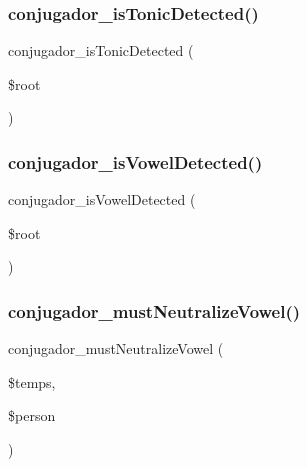 \subsubsection{\texorpdfstring{conjugador\+\_\+is\+Tonic\+Detected()}{conjugador\_isTonicDetected()}}
{\footnotesize\ttfamily conjugador\+\_\+is\+Tonic\+Detected (\begin{DoxyParamCaption}\item[{}]{\$root }\end{DoxyParamCaption})}

\hypertarget{conjugador__gr3_8inc_a688122e728649856c4dede0a1c1fabb5}{}\label{conjugador__gr3_8inc_a688122e728649856c4dede0a1c1fabb5} 
\subsubsection{\texorpdfstring{conjugador\+\_\+is\+Vowel\+Detected()}{conjugador\_isVowelDetected()}}
{\footnotesize\ttfamily conjugador\+\_\+is\+Vowel\+Detected (\begin{DoxyParamCaption}\item[{}]{\$root }\end{DoxyParamCaption})}

\hypertarget{conjugador__gr3_8inc_a1cfc9cf5cbbb005b55985d39ed2201c4}{}\label{conjugador__gr3_8inc_a1cfc9cf5cbbb005b55985d39ed2201c4} 
\subsubsection{\texorpdfstring{conjugador\+\_\+must\+Neutralize\+Vowel()}{conjugador\_mustNeutralizeVowel()}}
{\footnotesize\ttfamily conjugador\+\_\+must\+Neutralize\+Vowel (\begin{DoxyParamCaption}\item[{}]{\$temps,  }\item[{}]{\$person }\end{DoxyParamCaption})}

\hypertarget{conjugador__gr3_8inc_a947ef6897639f09bfec229c106a1baa3}{}\label{conjugador__gr3_8inc_a947ef6897639f09bfec229c106a1baa3} 
